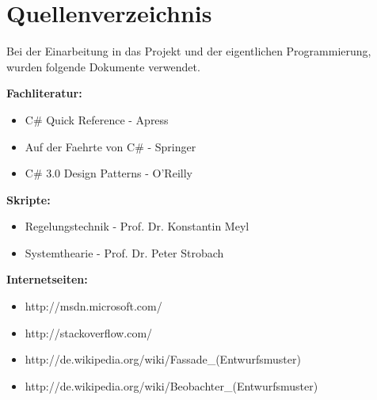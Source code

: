 \chapter{Quellenverzeichnis}

Bei der Einarbeitung in das Projekt und der eigentlichen Programmierung, wurden folgende Dokumente verwendet.

\begin{description}
	 
\item \textbf{Fachliteratur:}
				
\begin{itemize}
	\item C\# Quick Reference    -    Apress
	\item Auf der Faehrte von C\#    -    Springer
	\item C\# 3.0 Design Patterns    -    O'Reilly 
\end{itemize}

\item \textbf{Skripte:}
				
\begin{itemize}
	\item Regelungstechnik    -    Prof. Dr. Konstantin Meyl
	\item Systemthearie    -    Prof. Dr. Peter Strobach
\end{itemize}

\item \textbf{Internetseiten:}
				
\begin{itemize}
	\item http://msdn.microsoft.com/
	\item http://stackoverflow.com/
	\item http://de.wikipedia.org/wiki/Fassade\_(Entwurfsmuster)
	\item http://de.wikipedia.org/wiki/Beobachter\_(Entwurfsmuster)
\end{itemize}

\end{description}